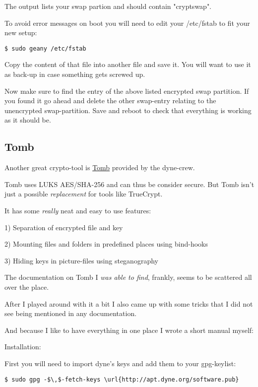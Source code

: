 \documentclass{article}
\begin{document}
 The output lists your swap partion and should contain "cryptswap". 


 To avoid error messages on boot you will need to edit your /etc/fstab to fit your new setup:
\begin{lstlisting}
$ sudo geany /etc/fstab
\end{lstlisting}



 Copy the content of that file into another file and save it. You will want to use it as back-up in case something gets screwed up.


 Now make sure to find the entry of the above listed encrypted swap partition. If you found it go ahead and delete the other swap-entry relating to the unencrypted swap-partition. Save and reboot to check that everything is working as it should be.
\subsection{Tomb}


 Another great crypto-tool is \href{http://tomb.dyne.org}{Tomb} provided by the dyne-crew. 


 Tomb uses LUKS AES/SHA-256 and can thus be consider secure. But Tomb isn't just a possible \emph{replacement} for tools like TrueCrypt.


 It has some \emph{really} neat and easy to use features:


 1) Separation of encrypted file and key

2) Mounting files and folders in predefined places using bind-hooks

3) Hiding keys in picture-files using steganography


 The documentation on Tomb I \emph{was able to find}, frankly, seems to be scattered all over the place. 

After I played around with it a bit I also came up with some tricks that I did not see being mentioned in any documentation.


 And because I like to have everything in one place I wrote a short manual myself:


 Installation:


 First you will need to import dyne's keys and add them to your gpg-keylist:
\begin{lstlisting}
$ sudo gpg -$\,$-fetch-keys \url{http://apt.dyne.org/software.pub}
\end{lstlisting}
\end{document}
